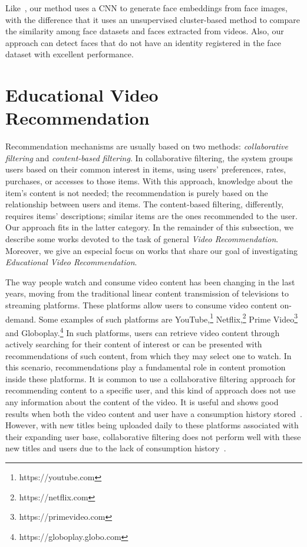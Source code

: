 Like~\cite{globofacestream, yang2017neural, rao2017attention, sohn2017unsupervised}, our method uses a CNN to generate face embeddings from face images, with the difference that it uses an unsupervised cluster-based method to compare the similarity among face datasets and faces extracted from videos. Also, our approach can detect faces that do not have an identity registered in the face dataset with excellent performance.

\section{Educational Video Recommendation}
\label{sec:recommendation}

Recommendation mechanisms are usually based on two methods: \textit{collaborative filtering} and \textit{content-based filtering}. 
In collaborative filtering, the system groups users based on their common interest in items, using users' preferences, rates, purchases, or accesses to those items. With this approach, 
knowledge about the item's content is not needed; the recommendation is purely based on the relationship between users and items.  The content-based filtering, differently, requires items' descriptions; similar items are the ones recommended to the user. Our approach fits in the latter category. In the remainder of this subsection, we describe some works devoted to the task of general \emph{Video Recommendation}. Moreover, we give an especial focus on works that share our goal of investigating \emph{Educational Video Recommendation}.

The way people watch and consume video content has been changing in the last years, moving from the traditional linear content transmission of televisions to streaming platforms. These platforms allow users to consume video content on-demand. Some examples of such platforms are YouTube,\footnote{https://youtube.com} Netflix,\footnote{https://netflix.com} Prime Video\footnote{https://primevideo.com} and Globoplay.\footnote{https://globoplay.globo.com} In such platforms, users can retrieve video content through actively searching for their content of interest or can be presented with recommendations of such content, from which they may select one to watch. 
In this scenario, recommendations play a fundamental role in content promotion inside these platforms. It is common to use a collaborative filtering approach for recommending content to a specific user, and this kind of approach does not use any information about the content of the video. It is useful and shows good results when both the video content and user have a consumption history stored~\cite{ferreira2020investigating}. 
However, with new titles being uploaded daily to these platforms associated with their expanding user base, collaborative filtering does not perform well with these new titles and users due to the lack of consumption history~\cite{suvash14social}. 

